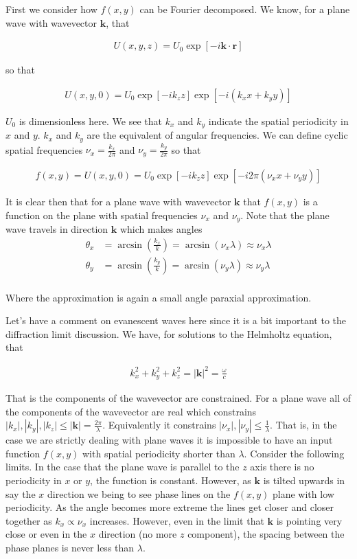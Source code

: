 \documentclass[12pt]{article}
\newcommand{\bv}[1]{\mathbf{#1}}
\begin{document}
First we consider how $f(x,y)$ can be Fourier decomposed. We know, for a plane wave with wavevector $\bv{k}$, that

\begin{align}
U(x,y,z) = U_0 \exp[-i\bv{k}\cdot\bv{r}]
\end{align}

so that

\begin{align}
U(x,y,0) = U_0 \exp[-ik_z z]\exp[-i (k_x x + k_y y)]
\end{align}

$U_0$ is dimensionless here. We see that $k_x$ and $k_y$ indicate the spatial periodicity in $x$ and $y$. $k_x$ and $k_y$ are the equivalent of angular frequencies. We can define cyclic spatial frequencies $\nu_x = \frac{k_x}{2\pi}$ and $\nu_y = \frac{k_y}{2\pi}$ so that

\begin{align}
f(x,y) = U(x,y,0) = U_0 \exp[-ik_z z]\exp[-i 2\pi(\nu_x x + \nu_y y)]
\end{align}

It is clear then that for a plane wave with wavevector $\bv{k}$ that $f(x,y)$ is a function on the plane with spatial frequencies $\nu_x$ and $\nu_y$. Note that the plane wave travels in direction $\bv{k}$ which makes angles 
\begin{align}
\theta_x &= \arcsin\left(\frac{k_x}{k}\right) =  \arcsin(\nu_x \lambda) \approx \nu_x \lambda\\
\theta_y &= \arcsin\left(\frac{k_y}{k}\right) =  \arcsin(\nu_y \lambda) \approx \nu_y \lambda\\
\end{align}

Where the approximation is again a small angle paraxial approximation.

Let's have a comment on evanescent waves here since it is a bit important to the diffraction limit discussion. We have, for solutions to the Helmholtz equation, that

\begin{align}
k_x^2+k_y^2+k_z^2 = |\bv{k}|^2 = \frac{\omega}{c}
\end{align}

That is the components of the wavevector are constrained. For a plane wave all of the components of the wavevector are real which constrains $|k_x|,|k_y|,|k_z| \le |\bv{k}| = \frac{2\pi}{\lambda}$. Equivalently it constrains $|\nu_x|,|\nu_y| \le \frac{1}{\lambda}$. That is, in the case we are strictly dealing with plane waves it is impossible to have an input function $f(x,y)$ with spatial periodicity shorter than $\lambda$. Consider the following limits. In the case that the plane wave is parallel to the $z$ axis there is no periodicity in $x$ or $y$, the function is constant. However, as $\bv{k}$ is tilted upwards in say the $x$ direction we being to see phase lines on the $f(x,y)$ plane with low periodicity. As the angle becomes more extreme the lines get closer and closer together as $k_x\propto \nu_x$ increases. However, even in the limit that $\bv{k}$ is pointing very close or even in the $x$ direction (no more $z$ component), the spacing between the phase planes is never less than $\lambda$.
\end{document}
